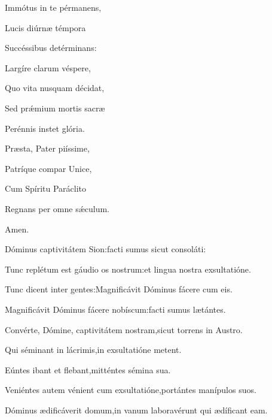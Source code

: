 \begin{multicols}{2}
\Hymne{}

Immótus in te pérmanens,

Lucis diúrnæ témpora

Succéssibus detérminans\thinspace:

\vspace{0.3cm}

Largíre clarum véspere,

Quo vita nusquam décidat,

Sed prǽmium mortis sacræ

Perénnis instet glória.

\vspace{0.3cm}

Præsta, Pater piíssime,

Patríque compar Unice,

Cum Spíritu Paráclito

Regnans per omne sǽculum.

\begin{flushright}
Amen.
\end{flushright}




\Normal

 Dóminus captivitátem Sion\thinspace:\GreStarNbsp facti sumus sicut consoláti\thinspace:

Tunc replétum est gáudio os nostrum\thinspace:\GreStarNbsp et lingua nostra exsultatióne.

Tunc dicent inter gentes\thinspace:\GreStarNbsp Magnificávit Dóminus fácere cum eis.

Magnificávit Dóminus fácere nobíscum\thinspace:\GreStarNbsp facti sumus lætántes.

Convérte, Dómine, captivitátem nostram,\GreStarNbsp sicut torrens in Austro.

Qui séminant in lácrimis,\GreStarNbsp in exsultatióne metent.

Eúntes ibant et flebant,\GreStarNbsp mitténtes sémina sua.

Veniéntes autem vénient cum exsultatióne,\GreStarNbsp portántes manípulos suos.



\Normal

 Dóminus ædificáverit domum,\GreStarNbsp in vanum laboravérunt qui ædíficant eam.


\end{multicols}
